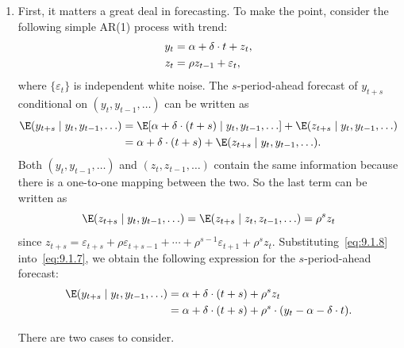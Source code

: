 \begin{enumerate}
\item First, it matters a great deal in forecasting. To make the point, consider the
following simple AR(1) process with trend:
\begin{align}
y_t &= \alpha + \delta \cdot t + z_t, \notag \\
z_t &= \rho z_{t-1} + \varepsilon_t,
\label{eq:9.1.6}
\end{align}
where $\{\varepsilon_t\}$ is independent white noise. The $s$-period-ahead forecast of $y_{t+s}$
conditional on $(y_t, y_{t-1}, \ldots)$ can be written as
\begin{align}
\E(y_{t+s} \mid y_t, y_{t-1}, \ldots)
&= \E[\alpha + \delta \cdot (t+s) \mid y_t, y_{t-1}, \ldots] + \E(z_{t+s} \mid y_t, y_{t-1}, \ldots) \notag \\
&= \alpha + \delta \cdot (t+s) + \E(z_{t+s} \mid y_t, y_{t-1}, \ldots).
\label{eq:9.1.7}
\end{align}
Both $(y_t, y_{t-1}, \ldots)$ and $(z_t, z_{t-1}, \ldots)$ contain the same information because
there is a one-to-one mapping between the two. So the last term can be written
as
\begin{equation}
\label{eq:9.1.8}
\E(z_{t+s} \mid y_t, y_{t-1}, \ldots) = \E(z_{t+s} \mid z_t, z_{t-1}, \ldots) = \rho^s z_t
\end{equation}
since $z_{t+s} = \varepsilon_{t+s} + \rho \varepsilon_{t+s-1} + \cdots + \rho^{s-1}\varepsilon_{t+1} + \rho^s z_t$.
Substituting~\eqref{eq:9.1.8} into~\eqref{eq:9.1.7}, we obtain the following expression for the
$s$-period-ahead forecast:
\begin{align}
\E(y_{t+s} \mid y_t, y_{t-1}, \ldots)
&= \alpha + \delta \cdot (t+s) + \rho^s z_t \notag \\
&= \alpha + \delta \cdot (t+s) + \rho^s \cdot (y_t - \alpha - \delta \cdot t).
\label{eq:9.1.9}
\end{align}

There are two cases to consider.


\end{enumerate}
